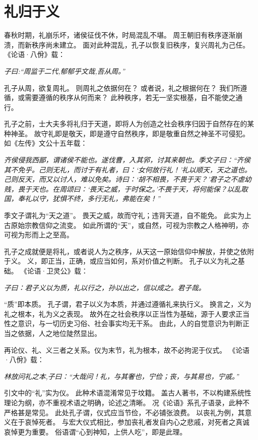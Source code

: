 \documentclass[11pt]{article}
\begin{document}
\section{礼归于义}
春秋时期，礼崩乐坏，诸侯征伐不休，时局混乱不堪。
周王朝旧有秩序逐渐崩溃，而新秩序尚未建立。
面对此种混乱，孔子以恢复旧秩序，复兴周礼为己任。
《论语·八佾》载：

\textit{子曰:“周监于二代,郁郁乎文哉,吾从周。”}

孔子从周，欲复周礼。
则周礼之依据何在？
或者说，礼之根据何在？
我们所遵循，或需要遵循的秩序从何而来？
此种秩序，若无一坚实根基，自不能使之通行。

\newline

孔子之前，士大夫多将礼归于天道，即将人为创造之社会秩序归因于自然存在的某种神圣。
故守礼即是敬天，即是遵守自然秩序，即是敬重自然之神圣不可侵犯。
如《左传》文公十五年载：

\textit{齐侯侵我西鄙，谓诸侯不能也。遂伐曹，入其郛，讨其来朝也。季文子曰：“齐侯其不免乎。己则无礼，而讨于有礼者，曰：‘女何故行礼！’礼以顺天，天之道也。己则反天，而又以讨人，难以免矣。诗曰：‘胡不相畏，不畏于天？’君子之不虐幼贱，畏于天也。在周颂曰：‘畏天之威，于时保之。’不畏于天，将何能保？以乱取国，奉礼以守，犹惧不终，多行无礼，弗能在矣！”}

季文子谓礼为“天之道”。
畏天之威，故而守礼；违背天道，自不能免。
此实为上古原始宗教信仰之流变。
如此所谓的“天”，或自然，可视为宗教之人格神明，亦可视为形而上之至高。

\newline

孔子之成就便是将礼，或者说人为之秩序，从天这一原始信仰中解放，并使之依附于义。
义，即正当，正确，或应当如何，系对价值之判断。
孔子以义为礼之基础。
《论语·卫灵公》载：

\textit{子曰：君子义以为质，礼以行之，孙以出之，信以成之。君子哉。}

“质”即本质。
孔子谓，君子以义为本质，并通过遵循礼来执行义。
换言之，义为礼之根本，礼为义之表现。
故外在之社会秩序以正当性为基础，源于人要求正当性之意识，与一切历史习俗、社会事实均无干系。
由此，人的自觉意识为判断正当之依据，人之地位陡然显出。

\newline

再论仪、礼、义三者之关系。仪为末节，礼为根本，故不必拘泥于仪式。
《论语·八佾》载：

\textit{林放问礼之本,子曰：“大哉问！礼，与其奢也，宁俭；丧，与其易也，宁戚。”}

引文中的“礼”实为仪。
此种术语混淆常见于坟籍。
盖古人著书，不以构建系统性理论为纲，亦不重视术语之明确，论述之清晰。
况《论语》系孔子语录，此种不严格甚是常见。
此处孔子谓，仪式应当节俭，不必铺张浪费。
以丧礼为例，其意义在于哀悼死者。
与宏大仪式相比，参加丧礼者发自内心之悲戚，对死者之真诚哀悼更为重要。
俗语谓“心到神知，上供人吃”，即是此理。
\end{document}
